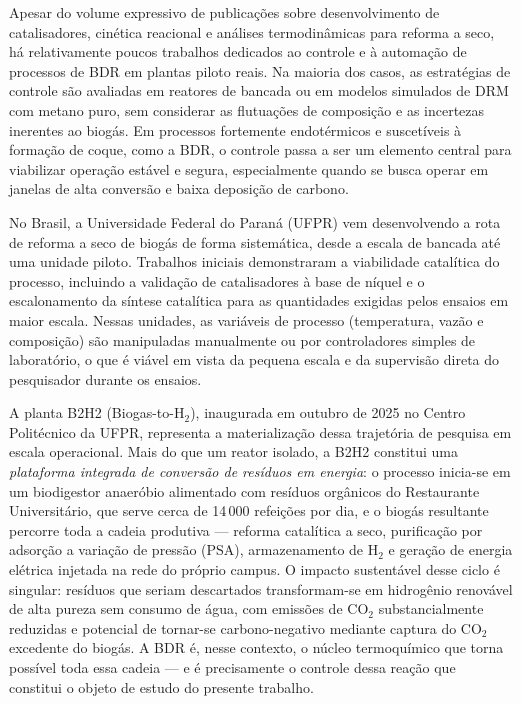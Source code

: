 Apesar do volume expressivo de publicações sobre desenvolvimento de catalisadores,
cinética reacional e análises termodinâmicas para reforma a seco, há relativamente
poucos trabalhos dedicados ao controle e à automação de processos de BDR em
plantas piloto reais.\citep{luyben2014,essien2019} Na maioria dos casos, as
estratégias de controle são avaliadas em reatores de bancada ou em modelos
simulados de DRM com metano puro, sem considerar as flutuações de composição e
as incertezas inerentes ao biogás. Em processos fortemente endotérmicos e
suscetíveis à formação de coque, como a BDR, o controle passa a ser um elemento
central para viabilizar operação estável e segura, especialmente quando se
busca operar em janelas de alta conversão e baixa deposição de
carbono.\citep{luyben2014}

No Brasil, a Universidade Federal do Paraná (UFPR) vem desenvolvendo a rota de
reforma a seco de biogás de forma sistemática, desde a escala de bancada até
uma unidade piloto. Trabalhos iniciais demonstraram a viabilidade catalítica do
processo, incluindo a validação de catalisadores à base de níquel e o
escalonamento da síntese catalítica para as quantidades exigidas pelos ensaios
em maior escala.\citep{oliveira2021,oliveira2022} Nessas unidades, as variáveis
de processo (temperatura, vazão e composição) são manipuladas manualmente ou
por controladores simples de laboratório, o que é viável em vista da pequena
escala e da supervisão direta do pesquisador durante os ensaios.\citep{oliveira2021}

A planta B2H2 (Biogas-to-H\(_2\)), inaugurada em outubro de 2025 no Centro
Politécnico da UFPR, representa a materialização dessa trajetória de pesquisa
em escala operacional.\citep{oliveira2025a,ferreira2025b} Mais do que um reator
isolado, a B2H2 constitui uma \textit{plataforma integrada de conversão de
resíduos em energia}: o processo inicia-se em um biodigestor anaeróbio
alimentado com resíduos orgânicos do Restaurante Universitário, que serve
cerca de 14\,000 refeições por dia, e o biogás resultante percorre toda a
cadeia produtiva --- reforma catalítica a seco, purificação por adsorção a
variação de pressão (PSA), armazenamento de H\(_2\) e geração de energia
elétrica injetada na rede do próprio campus.\citep{oliveira2025a} O impacto
sustentável desse ciclo é singular: resíduos que seriam descartados transformam-se
em hidrogênio renovável de alta pureza sem consumo de água, com emissões de
CO\(_2\) substancialmente reduzidas e potencial de tornar-se carbono-negativo
mediante captura do CO\(_2\) excedente do biogás.\citep{ferreira2025b}
A BDR é, nesse contexto, o núcleo termoquímico que torna possível toda essa
cadeia --- e é precisamente o controle dessa reação que constitui o objeto de
estudo do presente trabalho.

